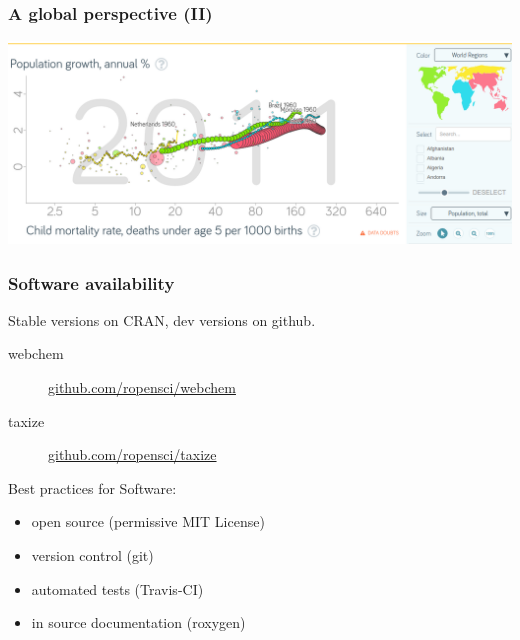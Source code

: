 \documentclass[
	10pt
	]{beamer}
\begin{document}
{%
\begin{frame}
\frametitle{A global perspective (II)}
	\includegraphics[width=\textwidth, keepaspectratio]{figs/pop_mort.png}
\end{frame}
}


{%
\begin{frame}
\frametitle{Software availability}
	Stable versions on CRAN, dev versions on github.
	\begin{description}
		\item[webchem]{\url{github.com/ropensci/webchem}}
		\item[taxize]{\url{github.com/ropensci/taxize}}
	\end{description}
	\vspace{1em}

Best practices for Software:
	\begin{itemize}
		\item open source (permissive MIT License)
		\item version control (git)
		\item automated tests (Travis-CI)
		\item in source documentation (roxygen)
	\end{itemize}
\end{frame}
}


\end{document}
